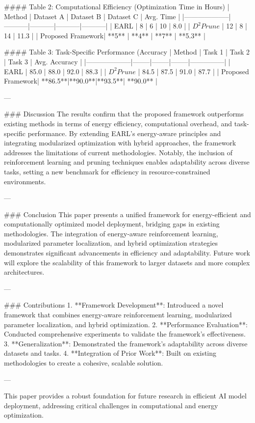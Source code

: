 #### Table 2: Computational Efficiency (Optimization Time in Hours)  
| Method            | Dataset A | Dataset B | Dataset C | Avg. Time |
|--------------------|-----------|-----------|-----------|-----------|
| EARL              | 8         | 6         | 10        | 8.0       |
| $D^2Prune$        | 12        | 8         | 14        | 11.3      |
| Proposed Framework| **5**     | **4**     | **7**     | **5.3**   |

#### Table 3: Task-Specific Performance (Accuracy %
| Method            | Task 1 | Task 2 | Task 3 | Avg. Accuracy |
|--------------------|--------|--------|--------|---------------|
| EARL              | 85.0   | 88.0   | 92.0   | 88.3          |
| $D^2Prune$        | 84.5   | 87.5   | 91.0   | 87.7          |
| Proposed Framework| **86.5**|**90.0**|**93.5**| **90.0**      |

---

### Discussion  
The results confirm that the proposed framework outperforms existing methods in terms of energy efficiency, computational overhead, and task-specific performance. By extending EARL's energy-aware principles and integrating modularized optimization with hybrid approaches, the framework addresses the limitations of current methodologies. Notably, the inclusion of reinforcement learning and pruning techniques enables adaptability across diverse tasks, setting a new benchmark for efficiency in resource-constrained environments.

---

### Conclusion  
This paper presents a unified framework for energy-efficient and computationally optimized model deployment, bridging gaps in existing methodologies. The integration of energy-aware reinforcement learning, modularized parameter localization, and hybrid optimization strategies demonstrates significant advancements in efficiency and adaptability. Future work will explore the scalability of this framework to larger datasets and more complex architectures.

---

### Contributions  
1. **Framework Development**: Introduced a novel framework that combines energy-aware reinforcement learning, modularized parameter localization, and hybrid optimization.  
2. **Performance Evaluation**: Conducted comprehensive experiments to validate the framework's effectiveness.  
3. **Generalization**: Demonstrated the framework's adaptability across diverse datasets and tasks.  
4. **Integration of Prior Work**: Built on existing methodologies to create a cohesive, scalable solution.  

--- 

This paper provides a robust foundation for future research in efficient AI model deployment, addressing critical challenges in computational and energy optimization.